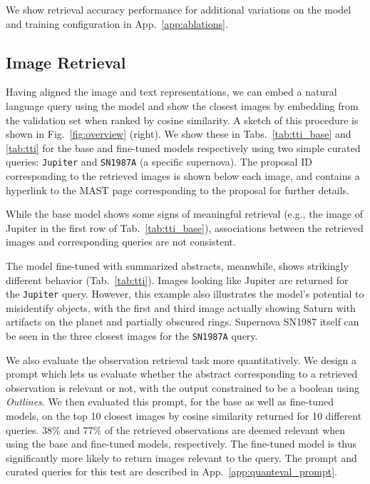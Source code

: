 \documentclass{article} %
\newcommand{\package}[1]{\textsl{#1}\xspace}
\newcommand{\changes}[1]{#1}
\begin{document}
   We show retrieval accuracy performance for additional variations on the model and training configuration in App.~\ref{app:ablations}.
   
   \subsection{Image Retrieval}
   
   Having aligned the image and text representations, we can embed a natural language query using the model and show the closest images by embedding from the validation set when ranked by cosine similarity. A sketch of this procedure is shown in Fig.~\ref{fig:overview} (right).
   We show these in Tabs.~\ref{tab:tti_base} and \ref{tab:tti} for the base and fine-tuned models respectively using two simple curated queries: \texttt{Jupiter} and  \texttt{SN1987A} (a specific supernova). The proposal ID corresponding to the retrieved images is shown below each image, and contains a hyperlink to the MAST page corresponding to the proposal for further details.
   
   While the base model shows some signs of meaningful retrieval (e.g., the image of Jupiter in the first row of Tab.~\ref{tab:tti_base}), 
   \changes{associations between the retrieved images and corresponding queries are not consistent.}
   
   The model fine-tuned with summarized abstracts, meanwhile, shows strikingly different behavior (Tab.~\ref{tab:tti}).
   Images looking like Jupiter are returned for the \texttt{Jupiter} query. 
   However, this example also illustrates the model's potential to misidentify objects, with the first and third image actually showing Saturn with artifacts on the planet and partially obscured rings.
   Supernova SN1987 itself can be seen in the three closest images for the \texttt{SN1987A} query.  %

   \changes{We also evaluate the observation retrieval task more quantitatively. We design a prompt which lets us evaluate whether the abstract corresponding to a retrieved observation is relevant or not, with the output constrained to be a boolean using \package{Outlines}. We then evaluated this prompt, for the base as well as fine-tuned models, on the top 10 closest images by cosine similarity returned for 10 different queries. 38\% and 77\% of the retrieved observations are deemed relevant when using the base and fine-tuned models, respectively. The fine-tuned model is thus significantly more likely to return images relevant to the query. The prompt and curated queries for this test are described in App.~\ref{app:quanteval_prompt}.}
   
\end{document}
